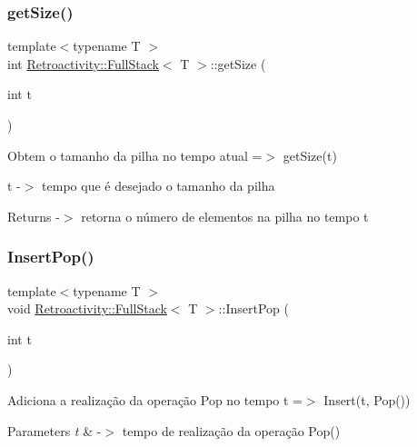 \subsubsection{\texorpdfstring{get\+Size()}{getSize()}}
{\footnotesize\ttfamily template$<$typename T $>$ \\
int \hyperlink{classRetroactivity_1_1FullStack}{Retroactivity\+::\+Full\+Stack}$<$ T $>$\+::get\+Size (\begin{DoxyParamCaption}\item[{int}]{t }\end{DoxyParamCaption})}

Obtem o tamanho da pilha no tempo atual =$>$ get\+Size(t)

t -\/$>$ tempo que é desejado o tamanho da pilha \begin{DoxyReturn}{Returns}
-\/$>$ retorna o número de elementos na pilha no tempo t 
\end{DoxyReturn}
\mbox{\label{classRetroactivity_1_1FullStack_a9187befbb123f18cf843cfb78f8ba2ae}} 
\subsubsection{\texorpdfstring{Insert\+Pop()}{InsertPop()}}
{\footnotesize\ttfamily template$<$typename T $>$ \\
void \hyperlink{classRetroactivity_1_1FullStack}{Retroactivity\+::\+Full\+Stack}$<$ T $>$\+::Insert\+Pop (\begin{DoxyParamCaption}\item[{int}]{t }\end{DoxyParamCaption})}

Adiciona a realização da operação Pop no tempo t =$>$ Insert(t, Pop())


\begin{DoxyParams}{Parameters}
{\em t} & -\/$>$ tempo de realização da operação Pop() \\
\hline
\end{DoxyParams}
\mbox{\label{classRetroactivity_1_1FullStack_a21e431dc5beaaba13e7ad4052ea590b4}} 
